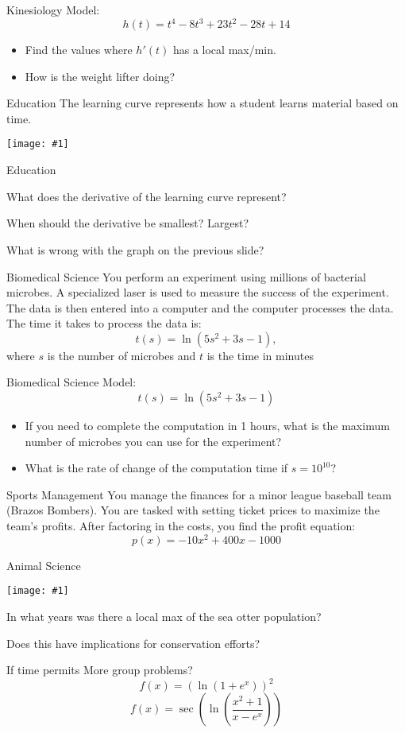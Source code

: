 \documentclass[t]{beamer}
\newenvironment{fpi}
  {\itemize[nolistsep,itemsep=\fill]}
  {\vfill\enditemize}
\newcommand{\img}[1]{
\vfill
\texttt{[image: \#1]}
\vfill
}
\begin{document}
\begin{frame}{Kinesiology}
Model:
$$h(t) = t^4 - 8t^3 + 23t^2 -28t + 14$$
\begin{itemize}
\item Find the values where $h'(t)$ has a local max/min.
\item How is the weight lifter doing?
\end{itemize}
\end{frame}

\begin{frame}{Education}
The learning curve represents how a student learns material
based on time.
\img{edu}
\end{frame}

\begin{frame}{Education}
\begin{fpi}
\item What does the derivative of the learning curve represent?
\item When should the derivative be smallest? Largest?
\item What is wrong with the graph on the previous slide?
\end{fpi}
\end{frame}

\begin{frame}{Biomedical Science}
You perform an experiment using millions of
bacterial microbes. A specialized laser is used to
measure the success of the experiment. The data
is then entered into a computer and the computer
processes the data.  The time it takes to process the data is:
$$t(s) = \ln(5s^2 + 3s - 1),$$
where $s$ is the number of microbes and
$t$ is the time in minutes
\end{frame}

\begin{frame}{Biomedical Science}
Model:
$$t(s) = \ln(5s^2 + 3s - 1)$$
\begin{itemize}
\item If you need to complete the computation in 1
hours, what is the maximum number of
microbes you can use for the experiment?
\item What is the rate of change of the computation
time if $s = 10^{10}$?
\end{itemize}
\end{frame}

\begin{frame}{Sports Management}
You manage the finances for a minor league
baseball team (Brazos Bombers). You are tasked
with setting ticket prices to maximize the team’s
profits. After factoring in the costs, you find the
profit equation:
$$p(x) = -10x^2 + 400x - 1000$$
\end{frame}

\begin{frame}{Animal Science}
\img{otters}
In what years was there a  local max of the sea otter population?

Does this have implications for conservation efforts?
\end{frame}

\begin{frame}{If time permits}
More group problems?
$$f(x) = (\ln(1 + e^x))^2$$
$$f(x) = \sec\left( \ln \left( \frac{x^2 + 1}{x - e^x} \right)
\right) $$
\end{frame}
\end{document}
